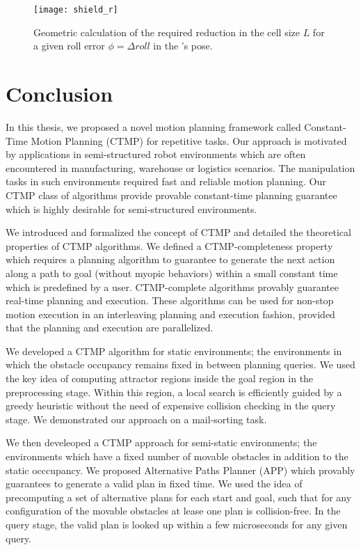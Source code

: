 \documentclass[a4paper]{report}
\begin{document}
\begin{figure}[bt]
\centering
\texttt{[image: shield\_r]}
\caption{Geometric calculation of the required reduction in the cell size $L$ for a given roll error $\phi = \Delta roll$ in the \calS's pose.}
\label{fig:shield_r}
\end{figure}

\newpage

\chapter{Conclusion}
In this thesis, we proposed a novel motion planning framework called Constant-Time Motion Planning (CTMP) for repetitive tasks. Our approach is motivated by applications in semi-structured robot environments which are often encountered in manufacturing, warehouse or logistics scenarios. The manipulation tasks in such environments required fast and reliable motion planning. Our CTMP class of algorithms provide provable constant-time planning guarantee which is highly desirable for semi-structured environments.

We introduced and formalized the concept of CTMP and detailed the theoretical properties of CTMP algorithms. We defined a CTMP-completeness property which requires a planning algorithm to guarantee to generate the next action along a path to goal (without myopic behaviors) within a small constant time which is predefined by a user. CTMP-complete algorithms provably guarantee real-time planning and execution. These algorithms can be used for non-stop motion execution in an interleaving planning and execution fashion, provided that the planning and execution are parallelized.

We developed a CTMP algorithm for static environments; the environments in which the obstacle occupancy remains fixed in between planning queries. We used the key idea of computing attractor regions inside the goal region in the preprocessing stage. Within this region, a local search is efficiently guided by a greedy heuristic without the need of expensive collision checking in the query stage. We demonstrated our approach on a mail-sorting task.

We then develeoped a CTMP approach for semi-static environments; the environments which have a fixed number of movable obstacles in addition to the static occcupancy. We proposed Alternative Paths Planner (APP) which provably guarantees to generate a valid plan in fixed time. We used the idea of precomputing a set of alternative plans for each start and goal, such that for any configuration of the movable obstacles at lease one plan is collision-free. In the query stage, the valid plan is looked up within a few microseconds for any given query.
\end{document}
